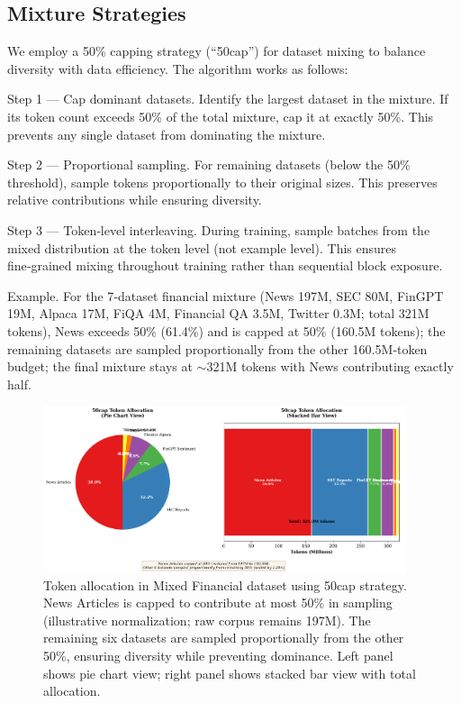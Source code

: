 \subsection{Mixture Strategies}

We employ a 50\% capping strategy (``50cap'') for dataset mixing to balance diversity with data efficiency. The algorithm works as follows:

Step 1 — Cap dominant datasets. Identify the largest dataset in the mixture. If its token count exceeds 50\% of the total mixture, cap it at exactly 50\%. This prevents any single dataset from dominating the mixture.

Step 2 — Proportional sampling. For remaining datasets (below the 50\% threshold), sample tokens proportionally to their original sizes. This preserves relative contributions while ensuring diversity.

Step 3 — Token‑level interleaving. During training, sample batches from the mixed distribution at the token level (not example level). This ensures fine‑grained mixing throughout training rather than sequential block exposure.

Example. For the 7‑dataset financial mixture (News 197M, SEC 80M, FinGPT 19M, Alpaca 17M, FiQA 4M, Financial QA 3.5M, Twitter 0.3M; total 321M tokens), News exceeds 50\% (61.4\%) and is capped at 50\% (160.5M tokens); the remaining datasets are sampled proportionally from the other 160.5M‑token budget; the final mixture stays at $\sim$321M tokens with News contributing exactly half.

\begin{figure}[h]
\centering
\includegraphics[width=0.95\textwidth]{figures/diagram_50cap.png}
\caption[50cap Mixture Strategy Visualization]{Token allocation in Mixed Financial dataset using 50cap strategy. News Articles is capped to contribute at most 50\% in sampling (illustrative normalization; raw corpus remains 197M). The remaining six datasets are sampled proportionally from the other 50\%, ensuring diversity while preventing dominance. Left panel shows pie chart view; right panel shows stacked bar view with total allocation.}
\label{fig:diagram_50cap}
\end{figure}

